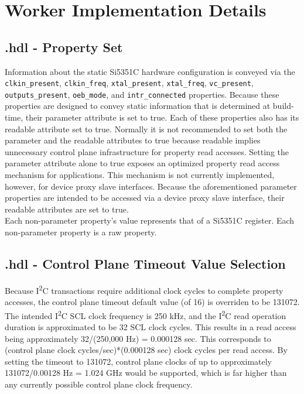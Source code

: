 \section*{Worker Implementation Details}
\subsection*{\comp.hdl - Property Set}
Information about the static Si5351C hardware configuration is conveyed via the \verb+clkin_present+, \verb+clkin_freq+, \verb+xtal_present+, \verb+xtal_freq+, \verb+vc_present+, \verb+outputs_present+, \verb+oeb_mode+, and \verb+intr_connected+ properties. Because these properties are designed to convey static information that is determined at build-time, their parameter attribute is set to true. Each of these properties also has its readable attribute set to true. Normally it is not recommended to set both the parameter and the readable attributes to true because readable implies unnecessary control plane infrastructure for property read accesses. Setting the parameter attribute alone to true exposes an optimized property read access mechanism for applications. This mechanism is not currently implemented, however, for device proxy slave interfaces. Because the aforementioned parameter properties are intended to be accessed via a device proxy slave interface, their readable attributes are set to true. \\

\noindent Each non-parameter property's value represents that of a Si5351C register. Each non-parameter property is a raw property. \\

\subsection*{\comp.hdl - Control Plane Timeout Value Selection}
\noindent Because I\textsuperscript{2}C transactions require additional clock cycles to complete property accesses, the control plane timeout default value (of 16) is overriden to be 131072. The intended I\textsuperscript{2}C SCL clock frequency is 250 kHz, and the I\textsuperscript{2}C read operation duration is approximated to be 32 SCL clock cycles. This results in a read access being approximately 32/(250,000 Hz) = 0.000128 sec. This corresponds to (control plane clock cycles/sec)*(0.000128 sec) clock cycles per read access. By setting the timeout to 131072, control plane clocks of up to approximately 131072/0.00128 Hz = 1.024 GHz would be supported, which is far higher than any currently possible control plane clock frequency.

